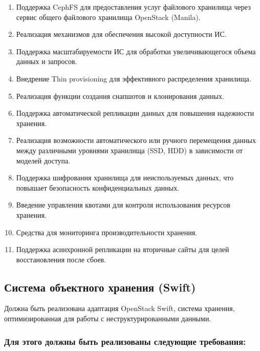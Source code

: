 \documentclass[14pt, a4paper]{extarticle}
\begin{document}
\begin{enumerate}
\item Поддержка CephFS для предоставления услуг файлового хранилища через сервис общего файлового хранилища OpenStack (Manila).
\item Реализация механизмов для обеспечения высокой доступности ИС.
\item Поддержка масштабируемости ИС для обработки увеличивающегося объема данных и запросов.
\item Внедрение Thin provisioning для эффективного распределения хранилища.
\item Реализация функции создания снапшотов и клонирования данных.
\item Поддержка автоматической репликации данных для повышения надежности хранения.
\item Реализация возможности автоматического или ручного перемещения данных между различными уровнями хранилища (SSD, HDD) в зависимости от моделей доступа.
\item Поддержка шифрования хранилища для неиспользуемых данных, что повышает безопасность конфиденциальных данных.
\item Введение управления квотами для контроля использования ресурсов хранения.
\item Средства для мониторинга производительности хранения.
\item Поддержка асинхронной репликации на вторичные сайты для целей восстановления после сбоев.
\end{enumerate}

\subsection{Система объектного хранения (Swift)}

Должна быть реализована адаптация OpenStack Swift, система хранения, оптимизированная для работы с неструктурированными данными.

\subsubsection*{Для этого должны быть реализованы следующие требования:}
\end{document}
